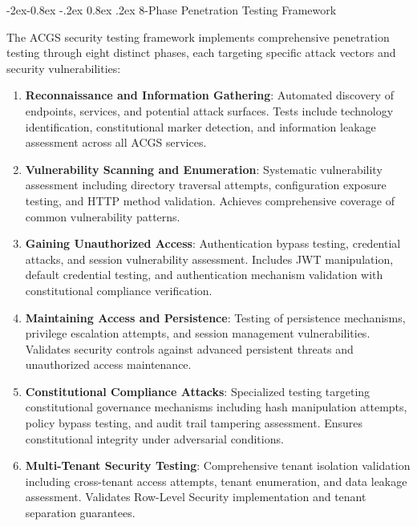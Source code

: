 \documentclass[manuscript,screen,9pt]{acmart}
\makeatletter
\renewcommand\subsubsection{\@startsection{subsubsection}{3}{\z@}%
  {-2ex\@plus -0.8ex \@minus -.2ex}%
  {0.8ex \@plus .2ex}%
  {\normalfont\normalsize\bfseries}}
\makeatother
\begin{document}
\subsubsection{8-Phase Penetration Testing Framework}
\label{subsubsec:penetration_testing}

The ACGS security testing framework implements comprehensive penetration testing through eight distinct phases, each targeting specific attack vectors and security vulnerabilities:

\begin{enumerate}[leftmargin=*,itemsep=2pt,parsep=1pt]
    \item \textbf{Reconnaissance and Information Gathering}: Automated discovery of endpoints, services, and potential attack surfaces. Tests include technology identification, constitutional marker detection, and information leakage assessment across all ACGS services.

    \item \textbf{Vulnerability Scanning and Enumeration}: Systematic vulnerability assessment including directory traversal attempts, configuration exposure testing, and HTTP method validation. Achieves comprehensive coverage of common vulnerability patterns.

    \item \textbf{Gaining Unauthorized Access}: Authentication bypass testing, credential attacks, and session vulnerability assessment. Includes JWT manipulation, default credential testing, and authentication mechanism validation with constitutional compliance verification.

    \item \textbf{Maintaining Access and Persistence}: Testing of persistence mechanisms, privilege escalation attempts, and session management vulnerabilities. Validates security controls against advanced persistent threats and unauthorized access maintenance.

    \item \textbf{Constitutional Compliance Attacks}: Specialized testing targeting constitutional governance mechanisms including hash manipulation attempts, policy bypass testing, and audit trail tampering assessment. Ensures constitutional integrity under adversarial conditions.

    \item \textbf{Multi-Tenant Security Testing}: Comprehensive tenant isolation validation including cross-tenant access attempts, tenant enumeration, and data leakage assessment. Validates Row-Level Security implementation and tenant separation guarantees.


\end{enumerate}
\end{document}
